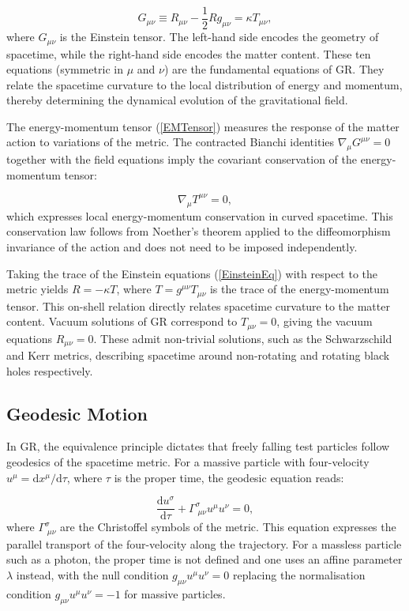 \documentclass[floats,floatfix,aps, preprintnumbers,nofootinbib]{revtex4-2}
\newcommand{\mrm}{\mathrm}
\begin{document}
\begin{equation}\label{EinsteinEq}
    G_{\mu\nu} \equiv R_{\mu\nu} - \frac{1}{2}Rg_{\mu\nu} = \kappa T_{\mu\nu},
\end{equation}
where $G_{\mu\nu}$ is the Einstein tensor. The left-hand side encodes the geometry of spacetime, while the right-hand side encodes the matter content. These ten equations (symmetric in $\mu$ and $\nu$) are the fundamental equations of GR. They relate the spacetime curvature to the local distribution of energy and momentum, thereby determining the dynamical evolution of the gravitational field.

The energy-momentum tensor (\ref{EMTensor}) measures the response of the matter action to variations of the metric. The contracted Bianchi identities $\nabla_\mu G^{\mu\nu} = 0$ together with the field equations imply the covariant conservation of the energy-momentum tensor:

\begin{equation}\label{Conservation}
    \nabla_\mu T^{\mu\nu} = 0,
\end{equation}
which expresses local energy-momentum conservation in curved spacetime. This conservation law follows from Noether's theorem applied to the diffeomorphism invariance of the action and does not need to be imposed independently.

Taking the trace of the Einstein equations (\ref{EinsteinEq}) with respect to the metric yields $R = -\kappa T$, where $T = g^{\mu\nu}T_{\mu\nu}$ is the trace of the energy-momentum tensor. This on-shell relation directly relates spacetime curvature to the matter content. Vacuum solutions of GR correspond to $T_{\mu\nu} = 0$, giving the vacuum equations $R_{\mu\nu} = 0$. These admit non-trivial solutions, such as the Schwarzschild and Kerr metrics, describing spacetime around non-rotating and rotating black holes respectively.

\subsection{Geodesic Motion}

In GR, the equivalence principle dictates that freely falling test particles follow geodesics of the spacetime metric. For a massive particle with four-velocity $u^\mu = \mrm dx^\mu/\mrm d\tau$, where $\tau$ is the proper time, the geodesic equation reads:

\begin{equation}\label{GeodesicGR}
    \frac{\mrm d u^\sigma}{\mrm d\tau} + \Gamma^\sigma_{\;\mu\nu}u^\mu u^\nu = 0,
\end{equation}
where $\Gamma^\sigma_{\;\mu\nu}$ are the Christoffel symbols of the metric. This equation expresses the parallel transport of the four-velocity along the trajectory. For a massless particle such as a photon, the proper time is not defined and one uses an affine parameter $\lambda$ instead, with the null condition $g_{\mu\nu}u^\mu u^\nu = 0$ replacing the normalisation condition $g_{\mu\nu}u^\mu u^\nu = -1$ for massive particles.
\end{document}
